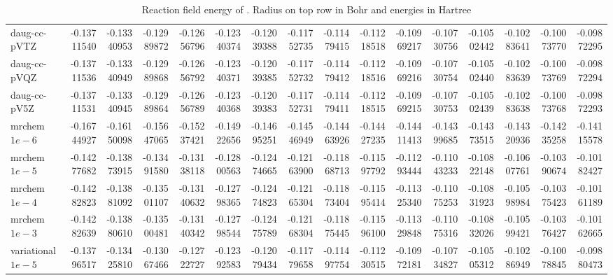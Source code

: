 \documentclass[../master_thesis.tex]{subfiles}
\begin{document}
\begin{sidewaystable}
{{\begin{tabular}{l|r|r|r|r|r|r|r|r|r|r|r|r|r|r|r}
daug-cc-pVTZ & -0.13711540 & -0.13340953 & -0.12989872 & -0.12656796 & -0.12340374 & -0.12039388 & -0.11752735 & -0.11479415 & -0.11218518 & -0.10969217 & -0.10730756 & -0.10502442 & -0.10283641 & -0.10073770 & -0.09872295 \\
daug-cc-pVQZ & -0.13711536 & -0.13340949 & -0.12989868 & -0.12656792 & -0.12340371 & -0.12039385 & -0.11752732 & -0.11479412 & -0.11218516 & -0.10969216 & -0.10730754 & -0.10502440 & -0.10283639 & -0.10073769 & -0.09872294 \\
daug-cc-pV5Z & -0.13711531 & -0.13340945 & -0.12989864 & -0.12656789 & -0.12340368 & -0.12039383 & -0.11752731 & -0.11479411 & -0.11218515 & -0.10969215 & -0.10730753 & -0.10502439 & -0.10283638 & -0.10073768 & -0.09872293 \\ \hline
mrchem $1e-6$ & -0.16744927 & -0.16150098 & -0.15647065 & -0.15237421 & -0.14922656 & -0.14695251 & -0.14546949 & -0.14463926 & -0.14427235 & -0.14411413 & -0.14399685 & -0.14373515 & -0.14320936 & -0.14235258 & -0.14115578 \\
mrchem $1e-5$& -0.14277682 & -0.13873915 & -0.13491580 & -0.13138118 & -0.12800563 & -0.12474665 & -0.12163900 & -0.11868713 & -0.11597792 & -0.11293444 & -0.11043233 & -0.10822148 & -0.10607761 & -0.10390674 & -0.10182427 \\
mrchem $1e-4$& -0.14282823 & -0.13881092 & -0.13501107 & -0.13140632 & -0.12798365 & -0.12474823 & -0.12165304 & -0.11873404 & -0.11595414 & -0.11325340 & -0.11075253 & -0.10831923 & -0.10598984 & -0.10375423 & -0.10161189 \\
mrchem $1e-3$& -0.14282639 & -0.13880610 & -0.13500481 & -0.13140342 & -0.12798544 & -0.12475789 & -0.12168304 & -0.11875445 & -0.11596100 & -0.11329848 & -0.11075316 & -0.10832026 & -0.10599421 & -0.10376427 & -0.10162665 \\
variational $1e-5$& -0.13796517 & -0.13425810 & -0.13067466 & -0.12722727 & -0.12392583 & -0.12079434 & -0.11779658 & -0.11497754 & -0.11230515 & -0.10972181 & -0.10734827 & -0.10505312 & -0.10286949 & -0.10078845 & -0.09880473 \\
\end{tabular}}}{\caption{Reaction field energy of . Radius on top row in Bohr and energies in Hartree}
\label{tab:Erdatalip}}
\end{sidewaystable}
\end{document}
